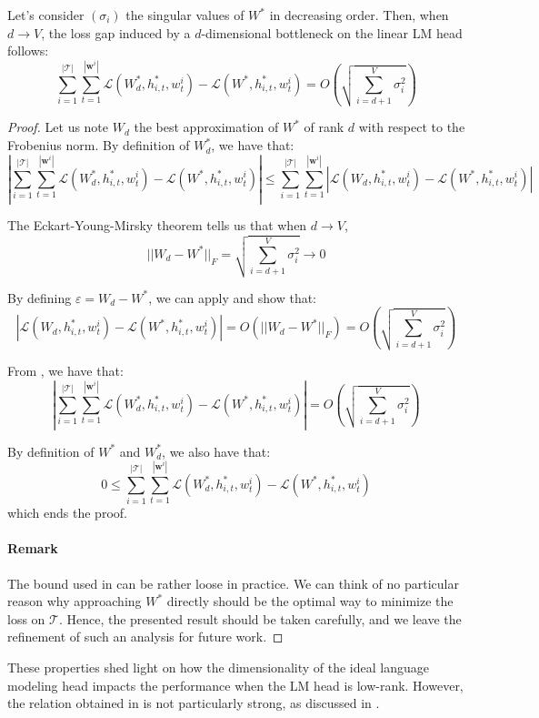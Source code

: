 \begin{theorem}
\label{main_thm}
Let's consider $(\sigma_i)$ the singular values of $W^*$ in decreasing order. Then, when $d \rightarrow V$, the loss gap induced by a $d$-dimensional bottleneck on the linear LM head follows:
$$
\sum_{i=1}^{|\mathcal{T}|} \sum_{t=1}^{|\mathbf{w}^i|} \mathcal{L}(W_d^*, h^*_{i,t}, w^i_t) - \mathcal{L}(W^*, h^*_{i,t}, w^i_t) = O\left(\sqrt{\sum_{i=d+1}^{V}\sigma_i^2}\right)$$
\end{theorem}
\begin{proof}
     Let us note $W_d$ the best approximation of $W^*$ of rank $d$ with respect to the Frobenius norm. By definition of $W_d^*$, we have that:
\begin{equation}
\label{eq:approx}
    \left|\sum_{i=1}^{|\mathcal{T}|} \sum_{t=1}^{|\mathbf{w}^i|} \mathcal{L}(W_d^*, h^*_{i,t}, w^i_t) - \mathcal{L}(W^*, h^*_{i,t}, w^i_t)\right| \leq \sum_{i=1}^{|\mathcal{T}|} \sum_{t=1}^{|\mathbf{w}^i|} \left|\mathcal{L}(W_d, h^*_{i,t}, w^i_t) - \mathcal{L}(W^*, h^*_{i,t}, w^i_t)\right|
\end{equation}


The Eckart-Young-Mirsky theorem tells us that when $d \rightarrow V$, 
$$||W_d - W^*||_F = \sqrt{\sum_{i=d+1}^{V} \sigma_i^2} \rightarrow 0$$

By defining $\varepsilon = W_d - W^*$, we can apply  and show that:
$$
\left|\mathcal{L}(W_d, h^*_{i,t}, w^i_t) - \mathcal{L}(W^*, h^*_{i,t}, w^i_t)\right| = O(||W_d - W^*||_F) = O\left(\sqrt{\sum_{i=d+1}^{V} \sigma_i^2}\right)
$$

From , we have that:
$$
\left|\sum_{i=1}^{|\mathcal{T}|} \sum_{t=1}^{|\mathbf{w}^i|} \mathcal{L}(W_d^*, h^*_{i,t}, w^i_t) - \mathcal{L}(W^*, h^*_{i,t}, w^i_t)\right| = O\left(\sqrt{\sum_{i=d+1}^{V} \sigma_i^2}\right)
$$

By definition of $W^*$ and $W_d^*$, we also have that:
$$
0 \leq \sum_{i=1}^{|\mathcal{T}|} \sum_{t=1}^{|\mathbf{w}^i|} \mathcal{L}(W_d^*, h^*_{i,t}, w^i_t) - \mathcal{L}(W^*, h^*_{i,t}, w^i_t)
$$
which ends the proof.

\paragraph{Remark} The bound used in  can be rather loose in practice. We can think of no particular reason why approaching $W^*$ directly should be the optimal way to minimize the loss on $\mathcal{T}$. Hence, the presented result should be taken carefully, and we leave the refinement of such an analysis for future work.

\end{proof}
These properties shed light on how the dimensionality of the ideal language modeling head impacts the performance when the LM head is low-rank. However, the relation obtained in  is not particularly strong, as discussed in .

